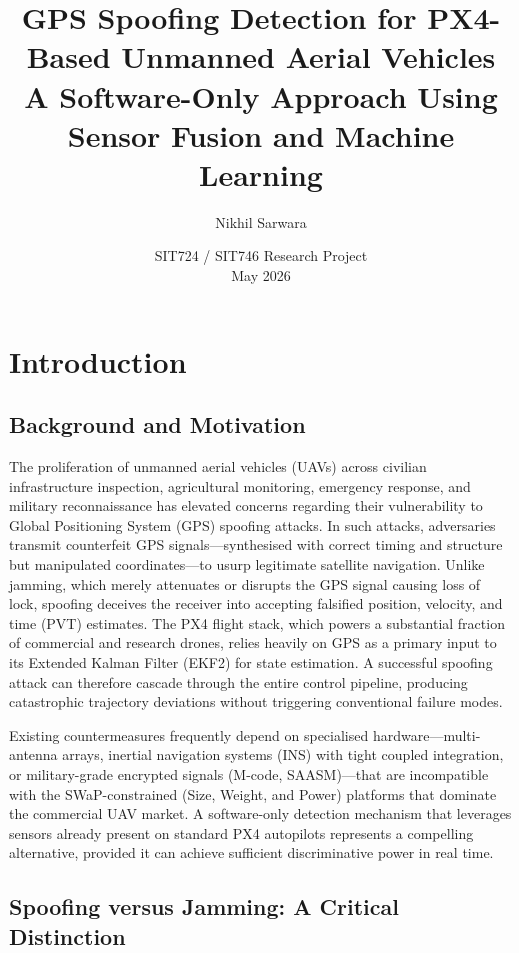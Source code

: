 \documentclass[11pt,a4paper]{article}
\title{\textbf{GPS Spoofing Detection for PX4-Based Unmanned Aerial Vehicles}\\[0.5em]
\large A Software-Only Approach Using Sensor Fusion and Machine Learning}
\author{Nikhil Sarwara}
\date{SIT724 / SIT746 Research Project\\May 2026}
\begin{document}
\maketitle

\tableofcontents
\newpage

\section{Introduction}

\subsection{Background and Motivation}

The proliferation of unmanned aerial vehicles (UAVs) across civilian infrastructure inspection, agricultural monitoring, emergency response, and military reconnaissance has elevated concerns regarding their vulnerability to Global Positioning System (GPS) spoofing attacks. In such attacks, adversaries transmit counterfeit GPS signals---synthesised with correct timing and structure but manipulated coordinates---to usurp legitimate satellite navigation. Unlike jamming, which merely attenuates or disrupts the GPS signal causing loss of lock, spoofing deceives the receiver into accepting falsified position, velocity, and time (PVT) estimates. The PX4 flight stack, which powers a substantial fraction of commercial and research drones, relies heavily on GPS as a primary input to its Extended Kalman Filter (EKF2) for state estimation. A successful spoofing attack can therefore cascade through the entire control pipeline, producing catastrophic trajectory deviations without triggering conventional failure modes.

Existing countermeasures frequently depend on specialised hardware---multi-antenna arrays, inertial navigation systems (INS) with tight coupled integration, or military-grade encrypted signals (M-code, SAASM)---that are incompatible with the SWaP-constrained (Size, Weight, and Power) platforms that dominate the commercial UAV market. A software-only detection mechanism that leverages sensors already present on standard PX4 autopilots represents a compelling alternative, provided it can achieve sufficient discriminative power in real time.

\subsection{Spoofing versus Jamming: A Critical Distinction}
\end{document}
